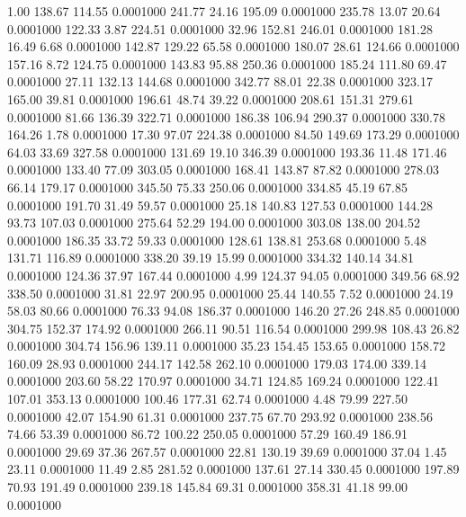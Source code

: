    1.00  138.67  114.55   0.0001000
 241.77   24.16  195.09   0.0001000
 235.78   13.07   20.64   0.0001000
 122.33    3.87  224.51   0.0001000
  32.96  152.81  246.01   0.0001000
 181.28   16.49    6.68   0.0001000
 142.87  129.22   65.58   0.0001000
 180.07   28.61  124.66   0.0001000
 157.16    8.72  124.75   0.0001000
 143.83   95.88  250.36   0.0001000
 185.24  111.80   69.47   0.0001000
  27.11  132.13  144.68   0.0001000
 342.77   88.01   22.38   0.0001000
 323.17  165.00   39.81   0.0001000
 196.61   48.74   39.22   0.0001000
 208.61  151.31  279.61   0.0001000
  81.66  136.39  322.71   0.0001000
 186.38  106.94  290.37   0.0001000
 330.78  164.26    1.78   0.0001000
  17.30   97.07  224.38   0.0001000
  84.50  149.69  173.29   0.0001000
  64.03   33.69  327.58   0.0001000
 131.69   19.10  346.39   0.0001000
 193.36   11.48  171.46   0.0001000
 133.40   77.09  303.05   0.0001000
 168.41  143.87   87.82   0.0001000
 278.03   66.14  179.17   0.0001000
 345.50   75.33  250.06   0.0001000
 334.85   45.19   67.85   0.0001000
 191.70   31.49   59.57   0.0001000
  25.18  140.83  127.53   0.0001000
 144.28   93.73  107.03   0.0001000
 275.64   52.29  194.00   0.0001000
 303.08  138.00  204.52   0.0001000
 186.35   33.72   59.33   0.0001000
 128.61  138.81  253.68   0.0001000
   5.48  131.71  116.89   0.0001000
 338.20   39.19   15.99   0.0001000
 334.32  140.14   34.81   0.0001000
 124.36   37.97  167.44   0.0001000
   4.99  124.37   94.05   0.0001000
 349.56   68.92  338.50   0.0001000
  31.81   22.97  200.95   0.0001000
  25.44  140.55    7.52   0.0001000
  24.19   58.03   80.66   0.0001000
  76.33   94.08  186.37   0.0001000
 146.20   27.26  248.85   0.0001000
 304.75  152.37  174.92   0.0001000
 266.11   90.51  116.54   0.0001000
 299.98  108.43   26.82   0.0001000
 304.74  156.96  139.11   0.0001000
  35.23  154.45  153.65   0.0001000
 158.72  160.09   28.93   0.0001000
 244.17  142.58  262.10   0.0001000
 179.03  174.00  339.14   0.0001000
 203.60   58.22  170.97   0.0001000
  34.71  124.85  169.24   0.0001000
 122.41  107.01  353.13   0.0001000
 100.46  177.31   62.74   0.0001000
   4.48   79.99  227.50   0.0001000
  42.07  154.90   61.31   0.0001000
 237.75   67.70  293.92   0.0001000
 238.56   74.66   53.39   0.0001000
  86.72  100.22  250.05   0.0001000
  57.29  160.49  186.91   0.0001000
  29.69   37.36  267.57   0.0001000
  22.81  130.19   39.69   0.0001000
  37.04    1.45   23.11   0.0001000
  11.49    2.85  281.52   0.0001000
 137.61   27.14  330.45   0.0001000
 197.89   70.93  191.49   0.0001000
 239.18  145.84   69.31   0.0001000
 358.31   41.18   99.00   0.0001000
